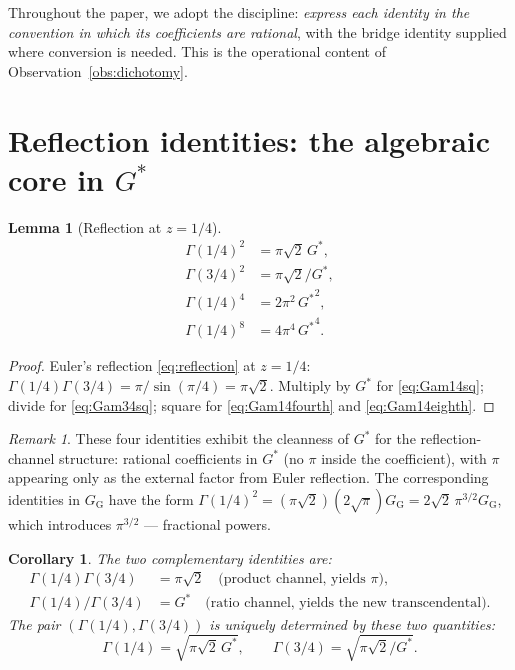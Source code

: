 \documentclass[11pt]{article}
\newtheorem{lemma}[theorem]{Lemma}
\newtheorem{corollary}[theorem]{Corollary}
\theoremstyle{definition}
\theoremstyle{remark}
\newtheorem*{remark}{Remark}
\newcommand{\Gs}{G^{*}}
\newcommand{\Gss}{{G^{*}}^{2}}
\newcommand{\GG}{G_{\!\scriptscriptstyle\mathrm{G}}}
\begin{document}
Throughout the paper, we adopt the discipline: \emph{express each identity
in the convention in which its coefficients are rational}, with the bridge
identity supplied where conversion is needed. This is the operational
content of Observation~\ref{obs:dichotomy}.

\section{Reflection identities: the algebraic core in $\Gs$}\label{sec:reflect}

\begin{lemma}[Reflection at $z = 1/4$]\label{lem:reflection}
\begin{align}
\Gamma(1/4)^2 &= \pi\sqrt{2}\,\Gs, \label{eq:Gam14sq}\\
\Gamma(3/4)^2 &= \pi\sqrt{2}/\Gs, \label{eq:Gam34sq}\\
\Gamma(1/4)^4 &= 2\pi^2\,\Gss, \label{eq:Gam14fourth}\\
\Gamma(1/4)^8 &= 4\pi^4\,{\Gs}^4. \label{eq:Gam14eighth}
\end{align}
\end{lemma}

\begin{proof}
Euler's reflection \eqref{eq:reflection} at $z = 1/4$:
$\Gamma(1/4)\Gamma(3/4) = \pi/\sin(\pi/4) = \pi\sqrt 2$.
Multiply by $\Gs$ for \eqref{eq:Gam14sq}; divide for \eqref{eq:Gam34sq};
square for \eqref{eq:Gam14fourth} and \eqref{eq:Gam14eighth}.
\end{proof}

\begin{remark}
These four identities exhibit the cleanness of $\Gs$ for the
reflection-channel structure: rational coefficients in $\Gs$
(no $\pi$ inside the coefficient), with $\pi$ appearing only as the
external factor from Euler reflection. The corresponding identities in
$\GG$ have the form $\Gamma(1/4)^2 = (\pi\sqrt 2)(2\sqrt\pi)\GG =
2\sqrt 2\,\pi^{3/2}\GG$, which introduces $\pi^{3/2}$ — fractional powers.
\end{remark}

\begin{corollary}\label{cor:reflection-extras}
The two complementary identities are:
\begin{align}
\Gamma(1/4)\Gamma(3/4) &= \pi\sqrt 2 \quad\text{(product channel, yields $\pi$)}, \\
\Gamma(1/4)/\Gamma(3/4) &= \Gs \quad\text{(ratio channel, yields the new transcendental)}.
\end{align}
The pair $(\Gamma(1/4), \Gamma(3/4))$ is uniquely determined by these two
quantities:
\[
\Gamma(1/4) = \sqrt{\pi\sqrt 2\,\Gs}, \qquad \Gamma(3/4) = \sqrt{\pi\sqrt 2/\Gs}.
\]
\end{corollary}
\end{document}

